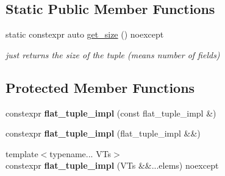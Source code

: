 \subsection*{Static Public Member Functions}
\begin{CompactItemize}
\item 
static constexpr auto \hyperlink{classhope_1_1detail_1_1flat__tuple__impl_3_01std_1_1index__sequence_3_01_is_8_8_8_4_00_01_ts_8_8_8_4_e8c18d2b32dc3aee7818265152bbfa46}{get\_\-size} () noexcept
\begin{CompactList}\small\item\em just returns the size of the tuple (means number of fields) \item\end{CompactList}\end{CompactItemize}
\subsection*{Protected Member Functions}
\begin{CompactItemize}
\item 
\hypertarget{classhope_1_1detail_1_1flat__tuple__impl_3_01std_1_1index__sequence_3_01_is_8_8_8_4_00_01_ts_8_8_8_4_2c05f9d62b48ab44dbc4493305e58e4e}{
constexpr \textbf{flat\_\-tuple\_\-impl} (const flat\_\-tuple\_\-impl \&)}
\label{classhope_1_1detail_1_1flat__tuple__impl_3_01std_1_1index__sequence_3_01_is_8_8_8_4_00_01_ts_8_8_8_4_2c05f9d62b48ab44dbc4493305e58e4e}

\item 
\hypertarget{classhope_1_1detail_1_1flat__tuple__impl_3_01std_1_1index__sequence_3_01_is_8_8_8_4_00_01_ts_8_8_8_4_095208e9f5ec49ad23353721d69f0868}{
constexpr \textbf{flat\_\-tuple\_\-impl} (flat\_\-tuple\_\-impl \&\&)}
\label{classhope_1_1detail_1_1flat__tuple__impl_3_01std_1_1index__sequence_3_01_is_8_8_8_4_00_01_ts_8_8_8_4_095208e9f5ec49ad23353721d69f0868}

\item 
\hypertarget{classhope_1_1detail_1_1flat__tuple__impl_3_01std_1_1index__sequence_3_01_is_8_8_8_4_00_01_ts_8_8_8_4_583a3a3d9e0227fc5aaf11133d8bd5be}{
{\footnotesize template$<$typename... VTs$>$ }\\constexpr \textbf{flat\_\-tuple\_\-impl} (VTs \&\&...elems) noexcept}
\label{classhope_1_1detail_1_1flat__tuple__impl_3_01std_1_1index__sequence_3_01_is_8_8_8_4_00_01_ts_8_8_8_4_583a3a3d9e0227fc5aaf11133d8bd5be}

\end{CompactItemize}


